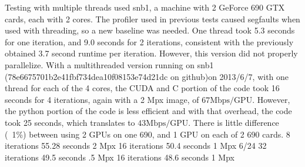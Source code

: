 \documentclass[11pt]{article}
\begin{document}
	Testing with multiple threads used snb1, a machine with 2 GeForce 690 GTX cards, each with 2 cores. The profiler used in previous tests caused segfaults when used with threading, so a new baseline was needed.  One thread took 5.3 seconds for one iteration, and 9.0 seconds for 2 iterations, consistent with the previously obtained 3.7 second runtime per iteration.  However, this version did not properly parallelize.
	With a multithreaded version running on snb1 (78e6675701b2e41fbf734dea10f08153e74d21dc on github)on 2013/6/7, with one thread for each of the 4 cores, the CUDA and C portion of the code took 16 seconds for 4 iterations, again with a 2 Mpx image, of $67 \mathrm{Mbps/GPU}$.  However, the python portion of the code is less efficient and with that overhead, the code took 25 seconds, which translates to $43 \mathrm{Mbps/GPU}$.  There is little difference (~1\%) between using 2 GPUs on one 690, and 1 GPU on each of 2 690 cards.
	8 iterations 55.28 seconds 2 Mpx
	16 iterations 50.4 seconds 1 Mpx
	6/24
	32 iterations 49.5 seconds .5 Mpx
	16 iterations 48.6 seconds 1 Mpx
	
\end{document}
